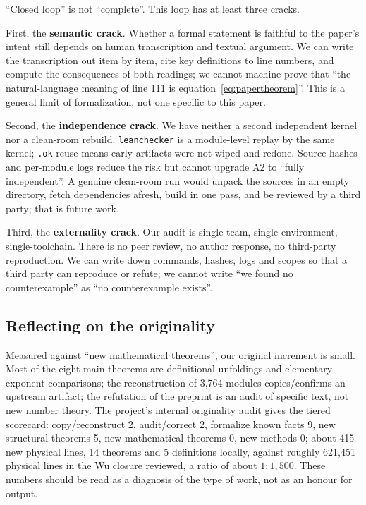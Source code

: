 \documentclass[11pt,a4paper]{article}
\theoremstyle{plain}
\theoremstyle{definition}
\begin{document}
``Closed loop'' is not ``complete''. This loop has at least three cracks.

First, the \textbf{semantic crack}. Whether a formal statement is faithful to the paper's intent still depends on human transcription and textual argument. We can write the transcription out item by item, cite key definitions to line numbers, and compute the consequences of both readings; we cannot machine-prove that ``the natural-language meaning of line 111 is equation~\eqref{eq:papertheorem}''. This is a general limit of formalization, not one specific to this paper.

Second, the \textbf{independence crack}. We have neither a second independent kernel nor a clean-room rebuild. \texttt{leanchecker} is a module-level replay by the same kernel; \texttt{.ok} reuse means early artifacts were not wiped and redone. Source hashes and per-module logs reduce the risk but cannot upgrade A2 to ``fully independent''. A genuine clean-room run would unpack the sources in an empty directory, fetch dependencies afresh, build in one pass, and be reviewed by a third party; that is future work.

Third, the \textbf{externality crack}. Our audit is single-team, single-environment, single-toolchain. There is no peer review, no author response, no third-party reproduction. We can write down commands, hashes, logs and scopes so that a third party can reproduce or refute; we cannot write ``we found no counterexample'' as ``no counterexample exists''.

\subsection{Reflecting on the originality}
\label{sec:reflexive}

Measured against ``new mathematical theorems'', our original increment is small. Most of the eight main theorems are definitional unfoldings and elementary exponent comparisons; the reconstruction of 3,764 modules copies/confirms an upstream artifact; the refutation of the preprint is an audit of specific text, not new number theory. The project's internal originality audit gives the tiered scorecard: copy/reconstruct 2, audit/correct 2, formalize known facts 9, new structural theorems 5, new mathematical theorems 0, new methods 0; about 415 new physical lines, 14 theorems and 5 definitions locally, against roughly 621,451 physical lines in the Wu closure reviewed, a ratio of about $1:1{,}500$. These numbers should be read as a diagnosis of the type of work, not as an honour for output.
\end{document}
